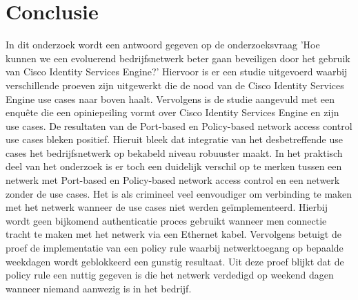 
\chapter{Conclusie}
\label{ch:conclusie}

In dit onderzoek wordt een antwoord gegeven op de onderzoeksvraag 'Hoe kunnen we een evoluerend bedrijfsnetwerk beter gaan beveiligen door het gebruik van Cisco Identity Services Engine?' Hiervoor is er een studie uitgevoerd waarbij verschillende proeven zijn uitgewerkt die de nood van de Cisco Identity Services Engine use cases naar boven haalt. Vervolgens is de studie aangevuld met een enquête die een opiniepeiling vormt over Cisco Identity Services Engine en zijn use cases.
\newline
\newline
De resultaten van de Port-based en Policy-based network access control use cases bleken positief. Hieruit bleek dat integratie van het desbetreffende use cases het bedrijfsnetwerk op bekabeld niveau robuuster maakt. In het praktisch deel van het onderzoek is er toch een duidelijk verschil op te merken tussen een netwerk met Port-based en Policy-based network access control en een netwerk zonder de use cases. Het is als crimineel veel eenvoudiger om verbinding te maken met het netwerk wanneer de use cases niet werden geïmplementeerd. Hierbij wordt geen bijkomend authenticatie proces gebruikt wanneer men connectie tracht te maken met het netwerk via een Ethernet kabel. Vervolgens betuigt de proef de implementatie van een policy rule waarbij netwerktoegang op bepaalde weekdagen wordt geblokkeerd een gunstig resultaat. Uit deze proef blijkt dat de policy rule een nuttig gegeven is die het netwerk verdedigd op weekend dagen wanneer niemand aanwezig is in het bedrijf.


